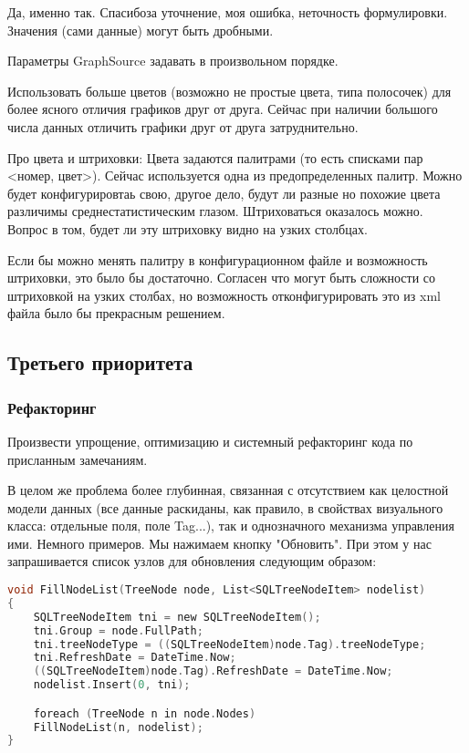 \documentclass[10pt,a4paper]{article}
\begin{document}
Да, именно так. Спасибоза уточнение, моя ошибка, неточность формулировки.
Значения (сами данные) могут быть дробными.

Параметры GraphSource задавать в произвольном порядке.

Использовать больше цветов (возможно не простые цвета, типа полосочек) для более
ясного отличия графиков друг от друга. Сейчас при наличии большого числа данных
отличить графики друг от друга затруднительно.

Про цвета и штриховки: Цвета задаются палитрами (то есть списками пар <номер,
цвет>). Сейчас используется одна из предопределенных палитр. Можно будет
конфигурировтаь свою, другое дело, будут ли разные но похожие цвета различимы
среднестатистическим глазом. Штриховаться оказалось можно. Вопрос в том, будет
ли эту штриховку видно на узких столбцах.

Если бы можно менять палитру в конфигурационном файле и возможность штриховки,
это было бы достаточно. Согласен что могут быть сложности со штриховкой на узких
столбах, но возможность отконфигурировать это из xml файла было бы прекрасным
решением.

\subsection{Третьего приоритета}

\subsubsection{Рефакторинг}

Произвести упрощение, оптимизацию и системный рефакторинг кода по присланным замечаниям.

В целом же проблема более глубинная, связанная с отсутствием как целостной
модели данных (все данные раскиданы, как правило, в свойствах визуального
класса: отдельные поля, поле Tag...), так и однозначного механизма управления
ими. Немного примеров. Мы нажимаем кнопку "Обновить". При этом у нас
запрашивается список узлов для обновления следующим образом:

\begin{lstlisting}[language=C,label=FillNodeList.cs,caption=FillNodeList.cs]
void FillNodeList(TreeNode node, List<SQLTreeNodeItem> nodelist)
{
	SQLTreeNodeItem tni = new SQLTreeNodeItem();
	tni.Group = node.FullPath;
	tni.treeNodeType = ((SQLTreeNodeItem)node.Tag).treeNodeType;
	tni.RefreshDate = DateTime.Now;
	((SQLTreeNodeItem)node.Tag).RefreshDate = DateTime.Now;
	nodelist.Insert(0, tni);

	foreach (TreeNode n in node.Nodes)
	FillNodeList(n, nodelist);
}
\end{lstlisting}
\end{document}
